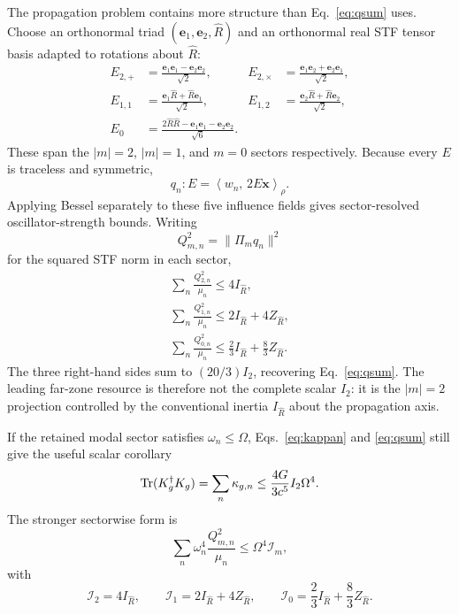 The propagation problem contains more structure than Eq.~\eqref{eq:qsum} uses. Choose an orthonormal triad $(\bm e_1,\bm e_2,\hat R)$ and an orthonormal real STF tensor basis adapted to rotations about $\hat R$:
\begin{align}
E_{2,+}&=\frac{\bm e_1\bm e_1-\bm e_2\bm e_2}{\sqrt2},
&
E_{2,\times}&=\frac{\bm e_1\bm e_2+\bm e_2\bm e_1}{\sqrt2},\\
E_{1,1}&=\frac{\bm e_1\hat R+\hat R\bm e_1}{\sqrt2},
&
E_{1,2}&=\frac{\bm e_2\hat R+\hat R\bm e_2}{\sqrt2},\\
E_0&=\frac{2\hat R\hat R-\bm e_1\bm e_1-\bm e_2\bm e_2}{\sqrt6}.
\end{align}
These span the $|m|=2$, $|m|=1$, and $m=0$ sectors respectively. Because every $E$ is traceless and symmetric,
\begin{equation}
q_n:E=\left\langle w_n,\,2E\bm x\right\rangle_\rho .
\label{eq:Einfluence}
\end{equation}
Applying Bessel separately to these five influence fields gives sector-resolved oscillator-strength bounds. Writing
\begin{equation}
Q_{m,n}^2=\|\Pi_m q_n\|^2
\end{equation}
for the squared STF norm in each sector,
\begin{align}
\boxed{
\sum_n\frac{Q_{2,n}^2}{\mu_n}
\le 4I_{\hat R},
}
\label{eq:m2resource}\\
\boxed{
\sum_n\frac{Q_{1,n}^2}{\mu_n}
\le 2I_{\hat R}+4Z_{\hat R},
}
\label{eq:m1resource}\\
\boxed{
\sum_n\frac{Q_{0,n}^2}{\mu_n}
\le \frac23I_{\hat R}+\frac83Z_{\hat R}.
}
\label{eq:m0resource}
\end{align}
The three right-hand sides sum to $(20/3)I_2$, recovering Eq.~\eqref{eq:qsum}. The leading far-zone resource is therefore not the complete scalar $I_2$: it is the $|m|=2$ projection controlled by the conventional inertia $I_{\hat R}$ about the propagation axis.

If the retained modal sector satisfies $\omega_n\le\Omega$, Eqs.~\eqref{eq:kappan} and \eqref{eq:qsum} still give the useful scalar corollary
\begin{equation}
\operatorname{Tr}(K_g^\dagger K_g)
=\sum_n\kappa_{g,n}
\le
\frac{4G}{3c^5}I_2\Omega^4 .
\label{eq:kappasum}
\end{equation}
The stronger sectorwise form is
\begin{equation}
\sum_n\omega_n^4\frac{Q_{m,n}^2}{\mu_n}
\le
\Omega^4\mathcal I_m,
\label{eq:weightedsector}
\end{equation}
with
\begin{equation}
\mathcal I_2=4I_{\hat R},\qquad
\mathcal I_1=2I_{\hat R}+4Z_{\hat R},\qquad
\mathcal I_0=\frac23I_{\hat R}+\frac83Z_{\hat R}.
\end{equation}

